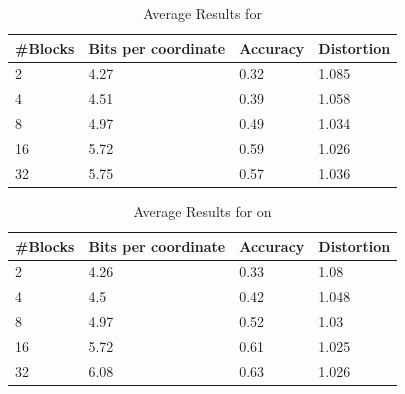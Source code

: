\begin{table}[h!]
	\centering
	\caption{Average Results for \qs{} \clust{}}
	\label{table:avg_clust_qs}	
	\begin{tabular}{l l l l}
		\hline
		\#Blocks & Bits per coordinate & Accuracy  & Distortion \\ \hline
		2 & 4.27	& 0.32 & 1.085  \\
		4 & 4.51 & 0.39 & 1.058  \\
		8 & 4.97 & 0.49 & 1.034 \\
		16 & 5.72 & 0.59 & 1.026 \\
		32 & 5.75 & 0.57 & 1.036 \\
		\hline
	\end{tabular}
\end{table}

\begin{table}[h!]
	\centering
	\caption{Average Results for \qsr{} on \clust{}}
	\label{table:avg_clust_qsr}
	\begin{tabular}{l l l l}
		\hline
		\#Blocks & Bits per coordinate & Accuracy  & Distortion \\ \hline
		2 & 4.26	& 0.33 & 1.08  \\
		4 & 4.5 & 0.42 & 1.048  \\
		8 & 4.97 & 0.52 & 1.03 \\
		16 & 5.72 & 0.61 & 1.025 \\
		32 & 6.08 & 0.63 & 1.026 \\
		\hline
	\end{tabular}
\end{table}
